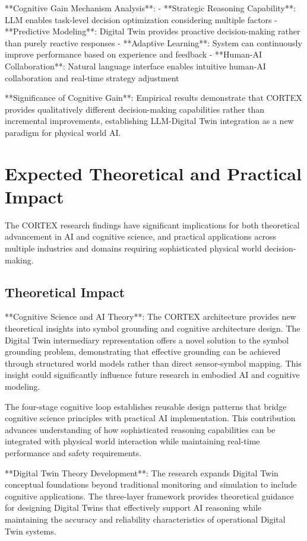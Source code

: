 **Cognitive Gain Mechanism Analysis**:
- **Strategic Reasoning Capability**: LLM enables task-level decision optimization considering multiple factors
- **Predictive Modeling**: Digital Twin provides proactive decision-making rather than purely reactive responses
- **Adaptive Learning**: System can continuously improve performance based on experience and feedback
- **Human-AI Collaboration**: Natural language interface enables intuitive human-AI collaboration and real-time strategy adjustment

**Significance of Cognitive Gain**: Empirical results demonstrate that CORTEX provides qualitatively different decision-making capabilities rather than incremental improvements, establishing LLM-Digital Twin integration as a new paradigm for physical world AI.

\section{Expected Theoretical and Practical Impact}

The CORTEX research findings have significant implications for both theoretical advancement in AI and cognitive science, and practical applications across multiple industries and domains requiring sophisticated physical world decision-making.

\subsection{Theoretical Impact}

**Cognitive Science and AI Theory**:
The CORTEX architecture provides new theoretical insights into symbol grounding and cognitive architecture design. The Digital Twin intermediary representation offers a novel solution to the symbol grounding problem, demonstrating that effective grounding can be achieved through structured world models rather than direct sensor-symbol mapping. This insight could significantly influence future research in embodied AI and cognitive modeling.

The four-stage cognitive loop establishes reusable design patterns that bridge cognitive science principles with practical AI implementation. This contribution advances understanding of how sophisticated reasoning capabilities can be integrated with physical world interaction while maintaining real-time performance and safety requirements.

**Digital Twin Theory Development**:
The research expands Digital Twin conceptual foundations beyond traditional monitoring and simulation to include cognitive applications. The three-layer framework provides theoretical guidance for designing Digital Twins that effectively support AI reasoning while maintaining the accuracy and reliability characteristics of operational Digital Twin systems.


